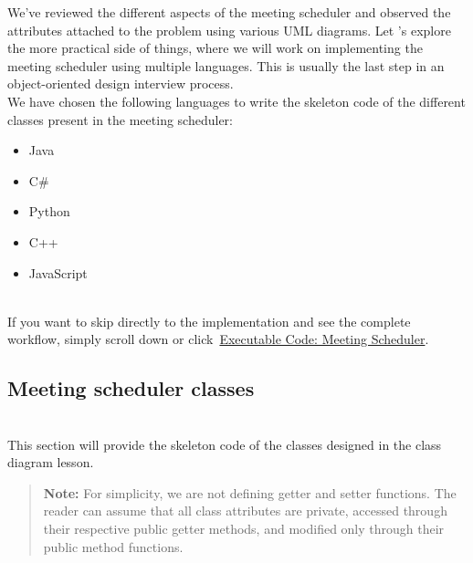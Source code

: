 

We've reviewed the different aspects of the meeting scheduler and observed the attributes attached to the problem using various UML diagrams. Let 's explore the more practical side of things, where we will work on implementing the meeting scheduler using multiple languages. This is usually the last step in an object-oriented design interview process.
\\
We have chosen the following languages to write the skeleton code of the different classes present in the meeting scheduler:

\begin{itemize}
\item
\protect{}\label{YWZm774Xjv7kUdYzKarKr}
Java
\item
\protect{}\label{svIF3ldOHtF5aC1t2FQ0a}
C\#
\item
\protect{}\label{ROHHR2ykqp5FrfzWi_kgN}
Python
\item
\protect{}\label{zeAMTGG_fTwh65gDRFWmh}
C++
\item
\protect{}\label{UIojGjoeXSvBYn8BYHagf}
JavaScript
\end{itemize}
\\
If you want to skip directly to the implementation and see the complete workflow, simply scroll down or click~\hyperref[Executable-code-Meeting-scheduler]{Executable Code: Meeting Scheduler}.

\subsection{Meeting scheduler classes}\label{qmPuiZ4xWbV1ysp-dtPX0}
\\
This section will provide the skeleton code of the classes designed in the class diagram lesson.
\begin{quote}
\textbf{Note:} For simplicity, we are not defining getter and setter functions. The reader can assume that all class attributes are private, accessed through their respective public getter methods, and modified only through their public method functions.
\end{quote}
